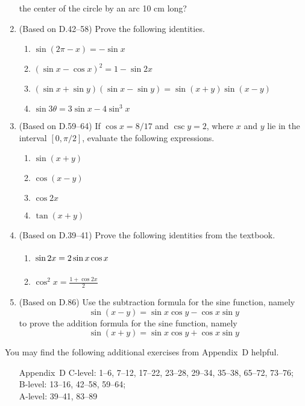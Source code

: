 \documentclass[11pt]{article}
\newcommand{\ds}{\displaystyle}
\begin{document}
\begin{enumerate}
  the center of the circle by an arc 10 cm long?
\item (Based on D.42--58) Prove the following identities.
  \begin{enumerate}
  \item $\ds \sin(2\pi - x) = -\sin x$
  \item $\ds (\sin x - \cos x)^2 = 1-\sin 2x$
  \item $\ds (\sin x + \sin y)(\sin x-\sin y) = \sin(x+y)\sin(x-y)$
  \item $\ds \sin 3\theta = 3\sin x - 4\sin^3 x $
  \end{enumerate}
\item (Based on D.59--64) If $\cos x=8/17$ and $\csc y = 2$, where $x$ and $y$
  lie in the interval $[0,\pi/2]$, evaluate the following expressions.
  \begin{multicols}{4}
  \begin{enumerate}
  \item $\ds \sin(x+y)$
  \item $\ds \cos(x-y)$
  \item $\ds \cos 2x$
  \item $\ds \tan(x+y)$
  \end{enumerate}
  \end{multicols}
\item (Based on D.39--41) Prove the following identities from the textbook.
  \begin{multicols}{2}
  \begin{enumerate}
  \item $\ds \vphantom{\frac{2}{2}}\sin 2x = 2\sin x \cos x$
  \item $\ds \cos^2 x = \frac{1+\cos 2x}{2}$
  \end{enumerate}
  \end{multicols}
\item (Based on D.86) Use the subtraction formula for the sine function, namely
  \begin{equation*}
    \sin(x-y) = \sin x \cos y - \cos x \sin y
  \end{equation*}
  to prove the addition formula for the sine function, namely
  \begin{equation*}
    \sin(x+y) = \sin x \cos y + \cos x \sin y
  \end{equation*}
\end{enumerate}

\noindent
You may find the following additional exercises from Appendix~D helpful.
\begin{itemize}
\item[Appendix~D] 
  C-level: 1--6, 7--12, 17--22, 23--28, 29--34, 35--38, 65--72, 73--76; \\
  B-level: 13--16, 42--58, 59--64; \\
  A-level: 39--41, 83--89
\end{itemize}
\end{document}
